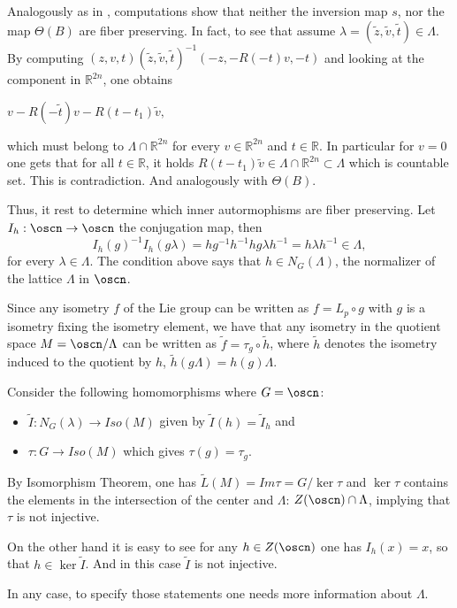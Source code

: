 \documentclass[12pt]{amsart}
\theoremstyle{plain}
\theoremstyle{definition}
\theoremstyle{remark}
\begin{document}
Analogously as in \cite{BOV}, computations show that neither the inversion map $s$, nor the map $\Theta(B)$ are fiber preserving.
In fact, to see that assume $\lambda=(\tilde{z},\tilde{v},\tilde{t})\in \Lambda$.  By computing 
		$(z,v,t)(\tilde{z},\tilde{v},\tilde{t})^{-1}(-z,-R(-t)v,-t)$ and looking at the component in $\mathbb R^{2n}$, one obtains 
				
		$v-R(-\tilde{t})v-R(t-t_1)\tilde{v},$ 
		
		which must belong to $\Lambda\cap \mathbb R^{2n}$ for every $v\in  \mathbb R^{2n}$ and $t\in \mathbb R$. In particular for $v=0$ one gets that for all $t\in \mathbb R$, it holds $R(t-t_1)\tilde{v}\in \Lambda\cap \mathbb R^{2n} \subset \Lambda$ which is countable set. This is contradiction. And analogously with $\Theta(B)$. 

Thus, it rest to determine which inner autormophisms are fiber preserving. Let $I_h: \oscn \to \oscn$ the conjugation map, then
$$I_h(g)^{-1}I_h(g\lambda)=hg^{-1}h^{-1} hg\lambda h^{-1}= h\lambda h^{-1}\in\Lambda,$$ for every $\lambda\in \Lambda$. The condition above says that  
  $h \in N_G(\Lambda)$, the normalizer of the lattice $\Lambda$ in $\oscn$. 

Since any isometry $f$ of the Lie group can be written as $f=L_p\circ g$ with $g$ is a isometry fixing the isometry element, we have that any isometry in the quotient space $M=\oscn/\Lambda$ can be written as $\tilde{f}=\tau_g\circ \tilde{h}$, where $\tilde{h}$ denotes the isometry induced to the quotient by $h$, $\tilde{h}(g\Lambda)=h(g)\Lambda$. 



Consider the following homomorphisms where $G=\oscn$:
\begin{itemize}
	\item $\widetilde{I}:N_G(\lambda) \to Iso(M)$ given by $\widetilde{I}(h)=\widetilde{I}_h$ and
	\item $\tau: G \to Iso(M)$ which gives $\tau(g)=\tau_g$.
\end{itemize}

By Isomorphism Theorem, one has $\tilde{L}(M)=Im\tau=G/\ker\tau$ and $\ker\tau$ contains the elements in the intersection of the center and $\Lambda$: $Z(\oscn)\cap \Lambda$, implying that $\tau$ is not injective. 

On the other hand it is easy to see for any $h\in Z(\oscn)$ one has $I_h(x)=x$, so that $h\in \ker \widetilde{I}$. And in this case $\widetilde{I}$ is not injective. 

In any case, to specify those statements one needs more information about $\Lambda$. 
\end{document}

